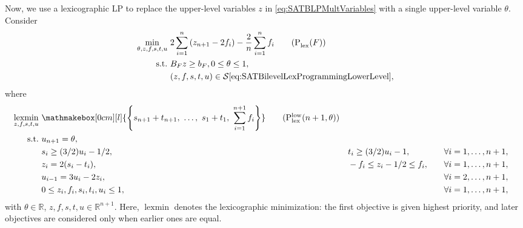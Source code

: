 \documentclass[runningheads,orivec]{llncs}
\newcommand{\MacroColor}[1]{#1}
\DeclareMathOperator*{\lexmin}{\MacroColor{lexmin}}
\newcommand{\NVariables}{\MacroColor{n}}
\newcommand{\OptSolSet}{\MacroColor{\mathcal{S}}}
\newcommand{\SATBooleanFormula}{\MacroColor{F}}
\newcommand{\ReformZ}{\MacroColor{z}}
\newcommand{\ReformAugFrac}{\MacroColor{f}}
\newcommand{\LexUVar}{\MacroColor{\theta}}
\newcommand{\LexLVarS}{\MacroColor{s}}
\newcommand{\LexLVarT}{\MacroColor{t}}
\newcommand{\LexLVarU}{\MacroColor{u}}
\begin{document}
Now, we use a lexicographic LP to replace the upper-level variables $\ReformZ$ in \eqref{eq:SATBLPMultVariables} with a single upper-level variable $\LexUVar$.
Consider
\begin{align}
\min_{\LexUVar, \ReformZ, \ReformAugFrac, \LexLVarS, \LexLVarT, \LexLVarU} \ & 2 \sum_{i = 1}^{n} \left(\ReformZ_{\NVariables + 1} - 2 \ReformAugFrac_i \right) - \frac{2}{n} \sum_{i = 1}^n \ReformAugFrac_i
\tag{P${}_{\text{lex}}^{\text{}}(\SATBooleanFormula)$}
\label{eq:SATBilevelLexProgramming}
\\
\text{s.t.} \ &
B_{\SATBooleanFormula} \ReformZ \ge b_{\SATBooleanFormula},
0 \le \LexUVar \le 1, \notag \\
&
(\ReformZ, \ReformAugFrac, \LexLVarS, \LexLVarT, \LexLVarU) 
\in
\OptSolSet\eqref{eq:SATBilevelLexProgrammingLowerLevel},
\notag 
\end{align}
where
\begin{alignat}{3}
\lexmin_{\ReformZ, \ReformAugFrac, \LexLVarS, \LexLVarT, \LexLVarU} \ & 
\mathmakebox[0cm][l]{
\left\{
\LexLVarS_{\NVariables + 1} + \LexLVarT_{\NVariables + 1}, \
\ldots, \
\LexLVarS_{1} + \LexLVarT_{1}, \
\sum_{i = 1}^{\NVariables + 1} \ReformAugFrac_i
\right\}
}
\tag{P${}_{\text{lex}}^{\text{low}}(\NVariables + 1, \LexUVar)$}
\label{eq:SATBilevelLexProgrammingLowerLevel}
\\
\text{s.t.} \
&
\LexLVarU_{\NVariables + 1} = \theta,
\notag
\\
&
\LexLVarS_i \ge (3/2) \LexLVarU_{i} - 1/2,
\qquad
&&
\LexLVarT_i \ge (3/2) \LexLVarU_{i} - 1,
\qquad
&&
\forall i = 1, \ldots, \NVariables + 1,
\notag \\
&
z_i = 2 (\LexLVarS_i - \LexLVarT_i),
&&
-\ReformAugFrac_i \le z_i - 1/2 \le \ReformAugFrac_i, 
\quad
&&
\forall i = 1, \ldots, \NVariables + 1,
\notag \\
&
\LexLVarU_{i - 1} = 3 \LexLVarU_i - 2 z_i,
&&
&&
\forall i = 2, \ldots, \NVariables + 1, \notag \\
&
0 \le \ReformZ_i, \ReformAugFrac_i, \LexLVarS_i, \LexLVarT_i, \LexLVarU_i \le 1,
&&
&&
\forall i = 1, \ldots, \NVariables + 1,
\notag
\end{alignat}
with $\LexUVar \in \mathbb{R}$, $\ReformZ, \ReformAugFrac, \LexLVarS, \LexLVarT, \LexLVarU \in \mathbb{R}^{\NVariables + 1}$.
\phantomsection\label{Rev:Lexmin} Here, $\lexmin$ denotes the lexicographic minimization: the first objective is given highest priority, and later objectives are considered only when earlier ones are equal.
\end{document}
